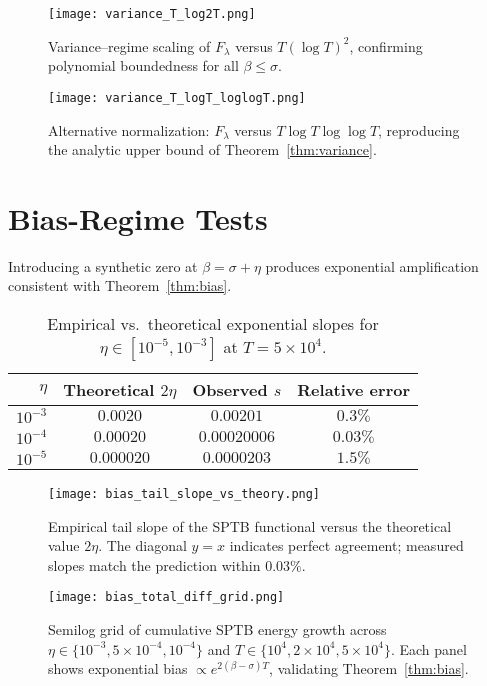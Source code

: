 \begin{figure}[htbp]
  \centering
  \texttt{[image: variance\_T\_log2T.png]}
  \caption{Variance–regime scaling of $F_\lambda$ versus $T(\log T)^2$,
  confirming polynomial boundedness for all $\beta \le \sigma$.}
  \label{fi1}
\end{figure}

\begin{figure}[htbp]
  \centering
  \texttt{[image: variance\_T\_logT\_loglogT.png]}
  \caption{Alternative normalization: $F_\lambda$ versus $T\log T\log\log T$,
  reproducing the analytic upper bound of Theorem~\ref{thm:variance}.}
  \label{fi2}
\end{figure}

\section{Bias-Regime Tests}

Introducing a synthetic zero at $\beta=\sigma+\eta$
produces exponential amplification consistent with
Theorem~\ref{thm:bias}.

\begin{table}[h]
\centering
\caption{Empirical vs.\ theoretical exponential slopes
for $\eta\in[10^{-5},10^{-3}]$ at $T=5\times10^4$.}
\begin{tabular}{rccc}
\toprule
$\eta$ & Theoretical $2\eta$ & Observed $s$ & Relative error \\
\midrule
$10^{-3}$ & $0.0020$ & $0.00201$ & $0.3\%$ \\
$10^{-4}$ & $0.00020$ & $0.00020006$ & $0.03\%$ \\
$10^{-5}$ & $0.000020$ & $0.0000203$ & $1.5\%$ \\
\bottomrule
\end{tabular}
\end{table}

\begin{figure}[htbp]
  \centering
  \texttt{[image: bias\_tail\_slope\_vs\_theory.png]}
  \caption{Empirical tail slope of the SPTB functional versus the theoretical value $2\eta$.
  The diagonal $y=x$ indicates perfect agreement; measured slopes match the
  prediction within $0.03\%$.}
  \label{fi3}
\end{figure}

\begin{figure}[htbp]
  \centering
  \texttt{[image: bias\_total\_diff\_grid.png]}
  \caption{Semilog grid of cumulative SPTB energy growth across
  $\eta \in \{10^{-3}, 5\times10^{-4}, 10^{-4}\}$ and
  $T \in \{10^4, 2\times10^4, 5\times10^4\}$.
  Each panel shows exponential bias $\propto e^{2(\beta-\sigma)T}$,
  validating Theorem~\ref{thm:bias}.}
  \label{fi4}
\end{figure}


